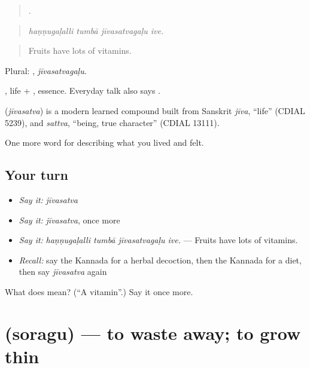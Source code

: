 \begin{quote}
   .
\end{quote}

\begin{quote}
\emph{haṇṇugaḷalli tumbā jīvasatvagaḷu ive.}
\end{quote}

\begin{quote}
Fruits have lots of vitamins.
\end{quote}

Plural: , \emph{jīvasatvagaḷu}.

, life + , essence. Everyday talk also says .

\begin{cousinweb}
\textbf{} (\emph{jīvasatva}) is a modern learned compound built from Sanskrit \emph{jīva}, \textquotedblleft{}life\textquotedblright{} (CDIAL 5239), and \emph{sattva}, \textquotedblleft{}being, true character\textquotedblright{} (CDIAL 13111).
\end{cousinweb}

\begin{grammarlens}[title={What you've built}]
One more word for describing what you lived and felt.
\end{grammarlens}

\subsection*{Your turn}
\begin{itemize}
\raggedright
  \item \emph{Say it:} \emph{jīvasatva}
  \item \emph{Say it:} \emph{jīvasatva}, once more
  \item \emph{Say it:} \emph{haṇṇugaḷalli tumbā jīvasatvagaḷu ive.} — Fruits have lots of vitamins.
  \item \emph{Recall:} say the Kannada for a herbal decoction, then the Kannada for a diet, then say \emph{jīvasatva} again
\end{itemize}

\begin{tcolorbox}[breakable,colback=teal!4,colframe=teal!35!black,title={Before you move on}]
What does  mean? (\textquotedblleft{}A vitamin\textquotedblright{}.) Say it once more.
\end{tcolorbox}
\section[\texorpdfstring{\kn{ಸೊರಗು} (soragu)}{ಸೊರಗು (soragu)}]{ (soragu) — to waste away; to grow thin}

